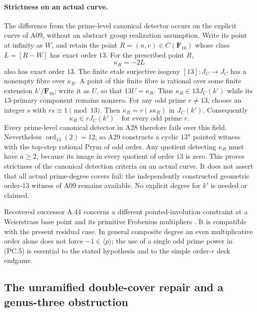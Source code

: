 \documentclass[11pt,a4paper]{article}
\begin{document}
\paragraph{Strictness on an actual curve.}
The difference from the prime-level canonical detector occurs on
the explicit curve of A09, without an abstract group realization
assumption. Write its point at infinity as $W$, and retain the
point $R=(u,v)\in C(\mathbf F_{16})$ whose class
$L=[R-W]$ has exact order $13$. For the prescribed point $R$,
\[
                   \kappa_R=-2L
 \tag{PC.13}
\]
also has exact order $13$. The finite etale surjective isogeny
$[13]:J_C\to J_C$ has a nonempty fibre over $\kappa_R$.
A point of this finite fibre is rational over some finite
extension $k'/\mathbf F_{16}$; write it as $U$, so that
$13U=\kappa_R$. Thus
$\kappa_R\in13J_C(k')$ while its $13$-primary component remains
nonzero. For any odd prime $r\ne13$, choose an integer $s$ with
$rs\equiv1\pmod{13}$. Then
$\kappa_R=r(s\kappa_R)$ in $J_C(k')$. Consequently
\[
                  \kappa_R\in rJ_C(k')
                    \quad\text{for every odd prime }r.
 \tag{PC.14}
\]
Every prime-level canonical detector in A28 therefore fails over
this field. Nevertheless $\operatorname{ord}_{13}(2)=12$, so
A29 constructs a cyclic $13^a$ pointed witness with the top-step
rational Prym of odd order. Any quotient detecting $\kappa_R$
must have $a\ge2$, because its image in every quotient of order
$13$ is zero. This proves strictness of the canonical detection
criteria on an actual curve. It does not assert that all actual
prime-degree covers fail: the independently constructed geometric
order-$13$ witness of A09 remains available. No explicit degree
for $k'$ is needed or claimed.

Recovered successor A.44 concerns a different pointed-involution
constraint at a Weierstrass base point and its primitive Frobenius
multipliers \cite[A.44]{ASrun}. It is compatible with the present
residual case. In general composite degree an even multiplicative
order alone does not force $-1\in\langle p\rangle$; the use of a
single odd prime power in (PC.5) is essential to the stated
hypothesis and to the simple order-$r$ deck endgame.


\subsection{The unramified double-cover repair and a genus-three obstruction}
\label{sec:genus-three-pointing-counterexample}
\end{document}
